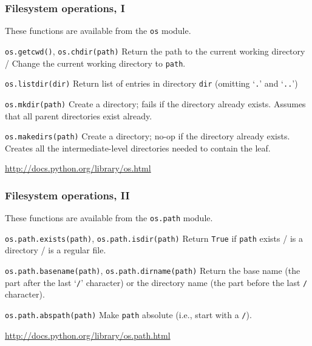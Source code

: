 \documentclass[english,serif,mathserif,xcolor=pdftex,dvipsnames,table]{beamer}
\begin{document}
\begin{frame}[fragile]
  \frametitle{Filesystem operations, I}
  \small
  These functions are available from the \texttt{os} module.

  \begin{describe}{\lstinline|os.getcwd()|, \lstinline|os.chdir(path)|}
    Return the path to the current working directory / 
    Change the current working directory to \texttt{path}.
  \end{describe}
    
  \begin{describe}{\lstinline|os.listdir(dir)|}
    Return list of entries in directory \texttt{dir} (omitting
    `\texttt{.}' and `\texttt{..}')
  \end{describe}
  
  \begin{describe}{\lstinline|os.mkdir(path)|}
    Create a directory; fails if the directory already exists.
    Assumes that all parent directories exist already.
  \end{describe}
  
  \begin{describe}{\lstinline|os.makedirs(path)|}
    Create a directory; no-op if the directory already exists.
    Creates all the intermediate-level directories needed to contain
    the leaf.
  \end{describe}
  
  \begin{references}
    \url{http://docs.python.org/library/os.html}
  \end{references}
\end{frame}


\begin{frame}[fragile]
  \frametitle{Filesystem operations, II}
  These functions are available from the \texttt{os.path} module.

  \begin{describe}{\lstinline|os.path.exists(path)|, 
      \lstinline|os.path.isdir(path)|}
    Return \texttt{True} if \texttt{path} exists / is a directory / is
    a regular file.
  \end{describe}
  
  \begin{describe}{\lstinline|os.path.basename(path)|, 
      \lstinline|os.path.dirname(path)|}
    Return the base name (the part after the last `\texttt{/}'
    character) or the directory name (the part before the last
    \texttt{/} character).
  \end{describe}
  
  \begin{describe}{\lstinline|os.path.abspath(path)|}
    Make \texttt{path} absolute (i.e., start with a \texttt{/}).
  \end{describe}
  
  \begin{references}
    \url{http://docs.python.org/library/os.path.html}
  \end{references}
\end{frame}
\end{document}
